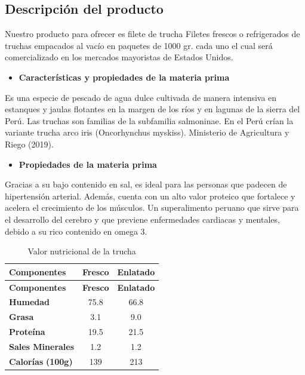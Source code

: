 \documentclass[
  stu,
  floatsintext,
  longtable,
  a4paper,
  nolmodern,
  notxfonts,
  notimes,
  colorlinks=true,linkcolor=blue,citecolor=blue,urlcolor=blue]{apa7}
\providecommand{\tightlist}{%
  \setlength{\itemsep}{0pt}\setlength{\parskip}{0pt}}
\begin{document}
\subsection{Descripción del producto}\label{descripciuxf3n-del-producto}

Nuestro producto para ofrecer es filete de trucha Filetes frescos o
refrigerados de truchas empacados al vacío en paquetes de 1000 gr. cada
uno el cual será comercializado en los mercados mayoristas de Estados
Unidos.

\begin{itemize}
\tightlist
\item
  \hspace{0pt} \textbf{Características y propiedades de la materia
  prima}
\end{itemize}

Es una especie de pescado de agua dulce cultivada de manera intensiva en
estanques y jaulas flotantes en la margen de los ríos y en lagunas de la
sierra del Perú. Las truchas son familias de la subfamilia salmoninae.
En el Perú crían la variante trucha arco iris (Oncorhynchus myskiss).
Ministerio de Agricultura y Riego (2019).

\begin{itemize}
\tightlist
\item
  \hspace{0pt} \textbf{Propiedades de la materia prima}
\end{itemize}

Gracias a su bajo contenido en sal, es ideal para las personas que
padecen de hipertensión arterial. Además, cuenta con un alto valor
proteico que fortalece y acelera el crecimiento de los músculos. Un
superalimento peruano que sirve para el desarrollo del cerebro y que
previene enfermedades cardiacas y mentales, debido a su rico contenido
en omega 3.

\begin{longtable}[]{@{}lcc@{}}
\caption{Valor nutricional de la trucha}\tabularnewline
\toprule\noalign{}
\textbf{Componentes} & \textbf{Fresco} & \textbf{Enlatado} \\
\midrule\noalign{}
\endfirsthead
\toprule\noalign{}
\textbf{Componentes} & \textbf{Fresco} & \textbf{Enlatado} \\
\midrule\noalign{}
\endhead
\bottomrule\noalign{}
\endlastfoot
\textbf{Humedad} & 75.8 & 66.8 \\
\textbf{Grasa} & 3.1 & 9.0 \\
\textbf{Proteína} & 19.5 & 21.5 \\
\textbf{Sales Minerales} & 1.2 & 1.2 \\
\textbf{Calorías} \textbf{(100g)} & 139 & 213 \\
\end{longtable}
\end{document}
